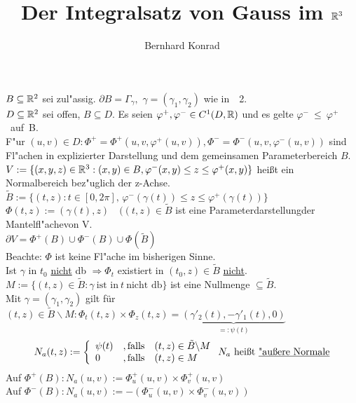 \documentclass{article}
\title{Der Integralsatz von Gauss im $\mathbb{R}^3$}
\author{Bernhard Konrad}
\begin{document}
\maketitle

\begin{definition}
$B \subseteq \mathbb{R}^2$ sei zul"assig. $\partial B = \Gamma_{\gamma}, \, \,
\gamma = (\gamma_1, \gamma_2)$ wie in~\textsection~2.\\
$D \subseteq \mathbb{R}^2$ sei offen, $B \subseteq D$. Es seien $\varphi^+,
\varphi^- \in C^1(D, \mathbb{R})$ und es gelte $\varphi^-~\leq~\varphi^+$~auf~B.\\
F"ur $(u,v) \in D: \Phi^+ = \Phi^+(u,v,\varphi^+(u,v)), \Phi^- =
\Phi^-(u,v,\varphi^-(u,v))$ sind Fl"achen in explizierter Darstellung und
dem gemeinsamen Parameterbereich $B$.\\
$V := \{ (x,y,z) \in \mathbb{R}^3: (x,y) \in B, \varphi^-(x,y) \leq z \leq
\varphi^+(x,y) \}$ heißt ein Normalbereich bez"uglich der z-Achse.\\
$\tilde{B} := \{ (t,z): t \in [0, 2\pi], \, \varphi^-(\gamma(t)) \leq z \leq
\varphi^+(\gamma(t)) \}$\\
$\Phi(t,z) := (\gamma(t),z) \quad ( (t,z) \in \tilde{B}$ ist eine
\glqq Parameterdarstellung\grqq der \glqq Mantelfl"ache\grqq von V.\\
$\partial V = \Phi^+(B) \cup \Phi^-(B) \cup \Phi(\tilde{B})$\\
Beachte: $\Phi$ ist keine Fl"ache im bisherigen Sinne.\\
Ist $\gamma$ in $t_0$ \underline{nicht} db $\Rightarrow \Phi_t$ existiert in
$(t_0,z) \in \tilde{B}$ \underline{nicht}.\\
$M := \{ (t,z) \in \tilde{B}: \gamma \ \mbox{ist in} \ t\ \mbox{nicht db}\}$ ist eine Nullmenge $\subseteq \tilde{B}$.\\
Mit $\gamma = (\gamma_1, \gamma_2)$ gilt für $(t,z) \in \tilde{B} \backslash
M: \Phi_t(t,z) \times \Phi_z(t,z) = \underbrace{(\gamma'_2 (t) , - \gamma'_1
(t), 0)}_{=: \psi (t)}$\\
\[
N_a(t,z) := \left\{ \begin{array}{ll}
               \psi(t) &, \mbox{falls} \quad (t,z) \in \tilde{B} \backslash
M \\
               0 &, \mbox{falls} \quad (t,z) \in M
               \end{array}
       \right.
       \mbox{$N_a$ hei\ss t \underline{"au\ss ere Normale}}
\]
Auf $\Phi^+(B): N_a(u,v) := \Phi_u^+(u,v) \times \Phi_v^+(u,v)$\\
Auf $\Phi^-(B): N_a(u,v) := - (\Phi_u^-(u,v) \times \Phi_v^-(u,v))$\\

\end{definition}
\end{document}
